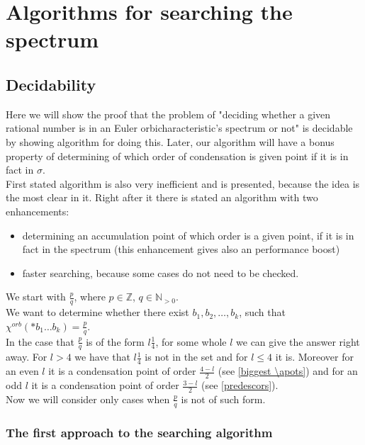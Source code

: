 \chapter{Algorithms for searching the spectrum}

\section{Decidability}
Here we will show the proof that the problem of "deciding whether a given rational number is in an 
Euler orbicharacteristic's spectrum or not" is decidable by showing algorithm for doing this. 
Later, our algorithm will have a bonus property of determining of which order of condensation 
is given point if it is in fact in $\sigma$. \\
First stated algorithm is also very inefficient and is presented, because the idea is the most 
clear in it. Right after it there is stated an algorithm with two enhancements: 
\begin{itemize}
\item determining an accumulation point of which order is a given point, if it is in fact in the 
spectrum (this enhancement gives also an performance boost)
\item faster searching, because some cases do not need to be checked. 
\end{itemize}
We start with $\frac{p}{q}$, where $p \in \mathbb{Z}$, $q \in \mathbb{N}_{>0}$. \\ 

We want to determine whether there exist $b_1,b_2,\dots,b_k$, such that $\chi^{orb}(*b_1\dots b_k) = 
\frac{p}{q}$. \\ 

In the case that $\frac{p}{q}$ is of the form $l\frac{1}{4}$, for some whole $l$ 
we can give the answer right away. For $l > 4$ we have that $l\frac{1}{4}$ is not in the set 
and for $l \leq 4$ it is. Moreover for an even $l$ it is a condensation point of order 
$\frac{4-l}{2}$ (see \ref{biggest \apots})
and for an odd $l$ it is a condensation point of order $\frac{3-l}{2}$ (see \ref{predescors}). \\

Now we will consider only cases when $\frac{p}{q}$ is not of such form.
\subsection{The first approach to the searching algorithm}

